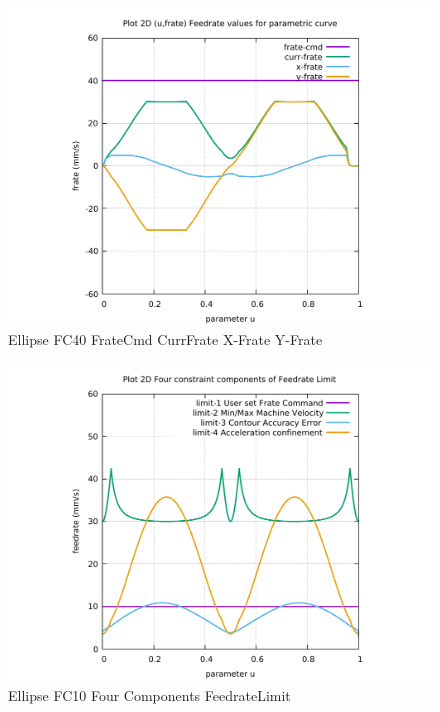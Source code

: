 \begin{figure}
	\caption     {Ellipse FC40 FrateCmd CurrFrate X-Frate Y-Frate}
	\label{30-img-Ellipse-FC40-FrateCmd-CurrFrate-X-Frate-Y-Frate.pdf}
	\includegraphics[width=1.00\textwidth]{Chap4/appendix/app-Ellipse/plots/30-img-Ellipse-FC40-FrateCmd-CurrFrate-X-Frate-Y-Frate.pdf}
\end{figure}


\clearpage
\pagebreak

\begin{figure}
	\caption     {Ellipse FC10 Four Components FeedrateLimit}
	\label{31-img-Ellipse-FC10-Four-Components-FeedrateLimit.pdf}
	\includegraphics[width=1.00\textwidth]{Chap4/appendix/app-Ellipse/plots/31-img-Ellipse-FC10-Four-Components-FeedrateLimit.pdf}
\end{figure}


